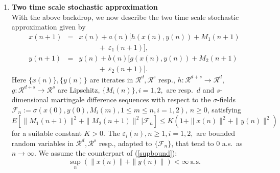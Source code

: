 \documentclass[12pt]{article}
\numberwithin{equation}{section}
\newcommand{\R}{\mathcal{R}}
\newcommand{\F}{\mathcal{F}}
\newcommand{\1}{\textbf{1}}
\begin{document}
\begin{enumerate}
From (\ref{ODElim}), one can deduce that a.s., $x(n) \to$ an \textit{internally chain transitive} invariant set of (\ref{ODE0}) \cite{Benaim}. This is the most general characterization of the asymptotics of (\ref{SA0}), see \textit{ibid.} for the definitions and further details. We shall deal with the simplest case - for us this set will be an equilibrium point.

\item \textbf{Two time scale stochastic approximation}\\

With the above backdrop, we now describe the two time scale stochastic approximation \cite{BorkarBook} given by
\begin{eqnarray}
x(n+1) &=& x(n) + a(n)\Big[h(x(n),y(n)) + M_1(n+1) \nonumber \\
&& \ \ \ \ \ \ \ \ \ \ \ \  + \ \varepsilon_1(n+1)\Big], \label{SAfast} \\
y(n+1) &=& y(n) + b(n)\Big[g(x(n),y(n)) + M_2(n+1) \nonumber \\
&& \ \ \ \ \ \ \ \ \ \ \ \ + \ \varepsilon_2(n+1)\Big]. \label{SAslow}
\end{eqnarray}
Here $\{x(n)\}, \{y(n)\}$ are iterates in $\R^d, \R^s$ resp., $h: \R^{d+s} \to \R^d$, $g: \R^{d+s} \to \R^s$ are Lipschitz,  $\{M_i(n)\}, i = 1,2,$ are resp.\ $d$ and $s$-dimensional martingale difference sequences with  respect to the $\sigma$-fields $\F_n := \sigma(x(0), y(0), M_i(m), 1 \leq m \leq n, i= 1,2)$, $n \geq 0$, satisfying 
\begin{equation}\label{twoscalebound}
E\left[\|M_1(n+1)\|^2 + \|M_2(n+1)\|^2 | \F_n\right] \leq K\left(1 + \|x(n)\|^2 + \|y(n)\|^2\right)
\end{equation}
for a suitable constant $K > 0$. The $\varepsilon_i(n), n \geq 1, i = 1,2,$ are bounded random variables in $\R^d, \R^s$ resp., adapted to $\{\F_n\}$, that tend to $0$ a.s.\ as $n\to\infty$. We assume the counterpart of (\ref{supbound}):
\begin{equation}\label{a.s.bound}
\sup_n\left(\|x(n)\| + \|y(n)\|\right) < \infty \ \mbox{a.s.}
\end{equation}



\end{enumerate}
\end{document}
